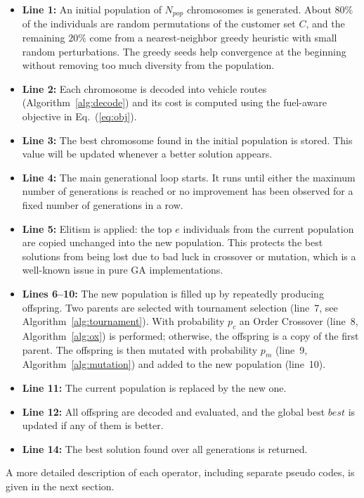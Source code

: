 \documentclass [a4paper, 11pt, titlepage] {article}
\begin{document}
\begin{itemize}
    \item \textbf{Line 1:} An initial population of $N_{pop}$ chromosomes is generated. About $80\%$ of the individuals are random permutations of the customer set $C$, and the remaining $20\%$ come from a nearest-neighbor greedy heuristic with small random perturbations. The greedy seeds help convergence at the beginning without removing too much diversity from the population.
    \item \textbf{Line 2:} Each chromosome is decoded into vehicle routes (Algorithm~\ref{alg:decode}) and its cost is computed using the fuel-aware objective in Eq.~(\ref{eq:obj}).
    \item \textbf{Line 3:} The best chromosome found in the initial population is stored. This value will be updated whenever a better solution appears.
    \item \textbf{Line 4:} The main generational loop starts. It runs until either the maximum number of generations is reached or no improvement has been observed for a fixed number of generations in a row.
    \item \textbf{Line 5:} Elitism is applied: the top $e$ individuals from the current population are copied unchanged into the new population. This protects the best solutions from being lost due to bad luck in crossover or mutation, which is a well-known issue in pure GA implementations.
    \item \textbf{Lines 6--10:} The new population is filled up by repeatedly producing offspring. Two parents are selected with tournament selection (line~7, see Algorithm~\ref{alg:tournament}). With probability $p_c$ an Order Crossover (line~8, Algorithm~\ref{alg:ox}) is performed; otherwise, the offspring is a copy of the first parent. The offspring is then mutated with probability $p_m$ (line~9, Algorithm~\ref{alg:mutation}) and added to the new population (line~10).
    \item \textbf{Line 11:} The current population is replaced by the new one.
    \item \textbf{Line 12:} All offspring are decoded and evaluated, and the global best $best$ is updated if any of them is better.
    \item \textbf{Line 14:} The best solution found over all generations is returned.
\end{itemize}

A more detailed description of each operator, including separate pseudo codes, is given in the next section.
\end{document}
